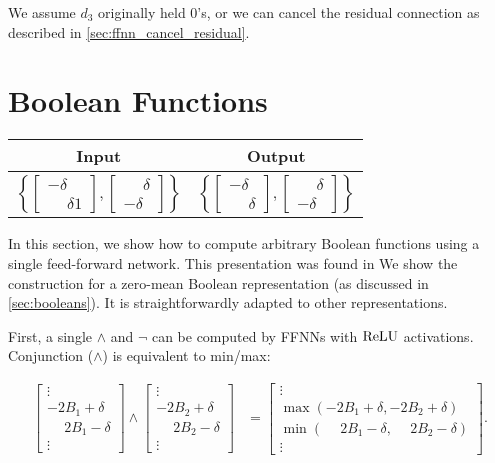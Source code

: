     We assume $d_3$ originally held $0$'s, or we can cancel the residual connection as described in \cref{sec:ffnn_cancel_residual}.

\section{Boolean Functions}\label{sec:ffnn_boolean}

    \begin{tabular}{|c|c|}
        \hline
        \rowcolor{orange!20} %
        \textbf{Input} & \textbf{Output} \\
        \hline
        $\left\{\begin{bmatrix}
            -\delta\\\phantom- \delta1
        \end{bmatrix}, \begin{bmatrix}
            \phantom- \delta\\-\delta
        \end{bmatrix}\right\}$ & $\left\{\begin{bmatrix}
            -\delta\\\phantom- \delta
        \end{bmatrix}, \begin{bmatrix}
            \phantom- \delta\\-\delta
        \end{bmatrix}\right\}$ \\
        \hline
    \end{tabular}

    In this section, we show how to compute arbitrary Boolean functions using a single feed-forward network.
    This presentation was found in \cite{yang2024counting} 
    We show the construction for a zero-mean Boolean representation (as discussed in \cref{sec:booleans}).
    It is straightforwardly adapted to other representations.

    First, a single $\land$ and $\lnot$ can be computed by FFNNs with $\text{ReLU}$ activations. Conjunction ($\land$) is equivalent to min/max:

    \begin{align*}
    \begin{bmatrix} \vdots \\ -2B_1+\delta \\ \phantom{-}2B_1-\delta \\ \vdots \end{bmatrix} \land \begin{bmatrix} \vdots \\ -2B_2+\delta \\ \phantom{-}2B_2-\delta \\ \vdots \end{bmatrix} &= \begin{bmatrix} \vdots \\ \max(-2B_1+\delta,-2B_2+\delta) \\ \min(\phantom{-}2B_1-\delta,\phantom{-}2B_2-\delta) \\ \vdots \end{bmatrix}.
    \end{align*}

